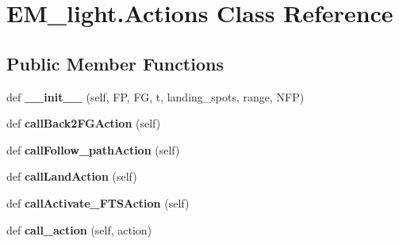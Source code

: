 \hypertarget{classEM__light_1_1Actions}{}\section{E\+M\+\_\+light.\+Actions Class Reference}
\label{classEM__light_1_1Actions}
\subsection*{Public Member Functions}
\begin{DoxyCompactItemize}
\item 
def {\bfseries \+\_\+\+\_\+init\+\_\+\+\_\+} (self, FP, FG, t, landing\+\_\+spots, range, N\+FP)\hypertarget{classEM__light_1_1Actions_a34b58c58a8bd5582c2c20273ff653ea6}{}\label{classEM__light_1_1Actions_a34b58c58a8bd5582c2c20273ff653ea6}

\item 
def {\bfseries call\+Back2\+F\+G\+Action} (self)\hypertarget{classEM__light_1_1Actions_a591579108d8f32fdc815666c984c427c}{}\label{classEM__light_1_1Actions_a591579108d8f32fdc815666c984c427c}

\item 
def {\bfseries call\+Follow\+\_\+path\+Action} (self)\hypertarget{classEM__light_1_1Actions_aee690e6172e59105b62e761c67a01d5f}{}\label{classEM__light_1_1Actions_aee690e6172e59105b62e761c67a01d5f}

\item 
def {\bfseries call\+Land\+Action} (self)\hypertarget{classEM__light_1_1Actions_a86b5fbd04563153a199632e63f2f2441}{}\label{classEM__light_1_1Actions_a86b5fbd04563153a199632e63f2f2441}

\item 
def {\bfseries call\+Activate\+\_\+\+F\+T\+S\+Action} (self)\hypertarget{classEM__light_1_1Actions_a96c2c83fd8e2aac1bdb7d2e808b9f471}{}\label{classEM__light_1_1Actions_a96c2c83fd8e2aac1bdb7d2e808b9f471}

\item 
def {\bfseries call\+\_\+action} (self, action)\hypertarget{classEM__light_1_1Actions_aca009faf50cf0a818e5c200e5dc55b6c}{}\label{classEM__light_1_1Actions_aca009faf50cf0a818e5c200e5dc55b6c}

\end{DoxyCompactItemize}
